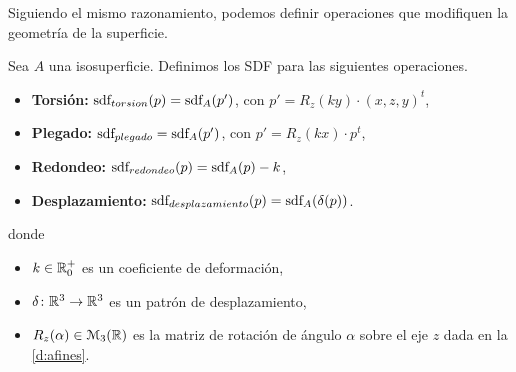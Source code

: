 Siguiendo el mismo razonamiento, podemos definir operaciones que modifiquen la geometría de la superficie.
\begin{definicion}
    Sea $A$ una isosuperficie. Definimos los SDF para las siguientes operaciones.
    \begin{itemize}
        
        \item \textbf{Torsión: } $\text{sdf}_{torsion}(p) = \text{sdf}_{A}(p')$, con $p' = R_z(ky)\cdot (x,z,y)^t$,
        \item \textbf{Plegado: } $\text{sdf}_{plegado} =\text{sdf}_{A}(p')$, con $p' = R_z(kx)\cdot p^t$,
        \item \textbf{Redondeo: } $\text{sdf}_{redondeo}(p) = \text{sdf}_{A}(p) - k$,
        \item \textbf{Desplazamiento: } $\text{sdf}_{desplazamiento}(p) = \text{sdf}_{A}(\delta(p))$.
    \end{itemize}

    donde
    \begin{itemize}
        \item $k\in \mathbb{R}^+_0$ es un coeficiente de deformación,
        \item $\delta\colon \mathbb{R}^3\to \mathbb{R}^3$ es un patrón de desplazamiento,
        \item $R_z(\alpha)\in \mathcal{M}_3(\mathbb{R})$ es la matriz de rotación de ángulo $\alpha$ sobre el eje $z$ dada en la \autoref{d:afines}.
    \end{itemize}
\end{definicion}


